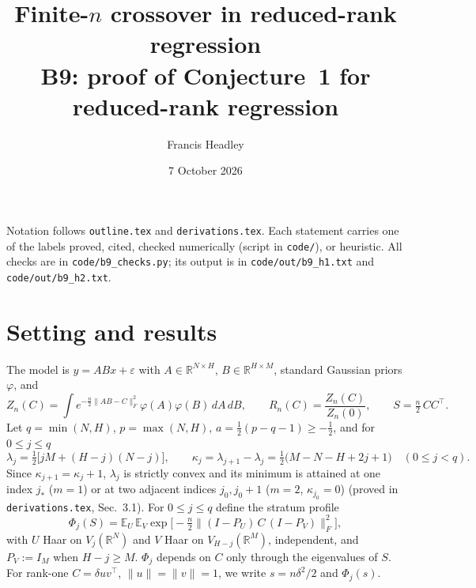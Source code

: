 \documentclass[11pt]{article}
\title{Finite-$n$ crossover in reduced-rank regression\\[2pt]
\large B9: proof of Conjecture~1 for reduced-rank regression}
\author{Francis Headley}
\date{7 October 2026}
\newcommand{\R}{\mathbb{R}}
\newcommand{\E}{\mathbb{E}}
\theoremstyle{remark}
\begin{document}
\maketitle

\noindent Notation follows \texttt{outline.tex} and \texttt{derivations.tex}.
Each statement carries one of the labels proved, cited, checked numerically (script in \texttt{code/}), or heuristic.
All checks are in \texttt{code/b9\_checks.py}; its output is in \texttt{code/out/b9\_h1.txt} and \texttt{code/out/b9\_h2.txt}.

\section{Setting and results}

The model is $y=ABx+\varepsilon$ with $A\in\R^{N\times H}$, $B\in\R^{H\times M}$, standard Gaussian priors $\varphi$, and
\begin{equation}
  Z_n(C)=\int e^{-\frac n2\lVert AB-C\rVert_F^2}\varphi(A)\varphi(B)\,dA\,dB,\qquad
  R_n(C)=\frac{Z_n(C)}{Z_n(0)},\qquad S=\tfrac n2\,CC^\top .
\end{equation}
Let $q=\min(N,H)$, $p=\max(N,H)$, $a=\tfrac12(p-q-1)\ge-\tfrac12$, and for $0\le j\le q$
\begin{equation}
  \lambda_j=\tfrac12\big[jM+(H-j)(N-j)\big],\qquad
  \kappa_j=\lambda_{j+1}-\lambda_j=\tfrac12\big(M-N-H+2j+1\big)\quad(0\le j<q).
  \label{eq:lamj}
\end{equation}
Since $\kappa_{j+1}=\kappa_j+1$, $\lambda_j$ is strictly convex and its minimum is attained at one index $j_*$ ($m=1$) or at two adjacent indices $j_0,j_0+1$ ($m=2$, $\kappa_{j_0}=0$) (proved in \texttt{derivations.tex}, Sec.~3.1).
For $0\le j\le q$ define the stratum profile
\begin{equation}
  \Phi_j(S)=\E_{U}\,\E_{V}\exp\!\Big[-\tfrac n2\big\lVert(I-P_U)\,C\,(I-P_V)\big\rVert_F^2\Big],
  \label{eq:Phi}
\end{equation}
with $U$ Haar on $V_j(\R^N)$ and $V$ Haar on $V_{H-j}(\R^M)$, independent, and $P_V:=I_M$ when $H-j\ge M$.
$\Phi_j$ depends on $C$ only through the eigenvalues of $S$.
For rank-one $C=\delta uv^\top$, $\lVert u\rVert=\lVert v\rVert=1$, we write $s=n\delta^2/2$ and $\Phi_j(s)$.
\end{document}

